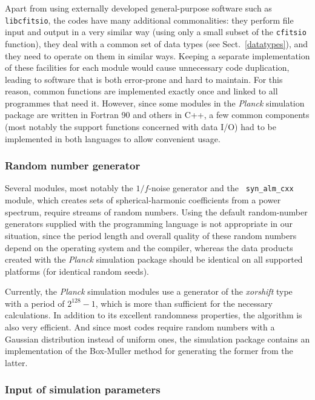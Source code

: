 \documentclass{aa}
\begin{document}
Apart from using externally developed general-purpose software such as
{\tt libcfitsio}, the codes have many additional commonalities:
they perform file
input and output in a very similar way (using only a small subset of
the {\tt cfitsio} function), they deal with a common set of data
types (see Sect.~\ref{datatypes}), and they need to operate on them in
similar ways. Keeping a separate implementation of these facilities
for each module would cause unnecessary code duplication, leading to
software that is both error-prone and hard to maintain. For this
reason, common functions are implemented exactly once and linked to
all programmes that need it. However, since some modules in the
\emph{Planck} simulation package are written in Fortran 90 and others
in C++, a few common components (most notably the support functions
concerned with data I/O) had to be implemented in both
languages to allow convenient usage.

\subsubsection {Random number generator}

Several modules, most notably the $1/f$-noise generator and the {\tt
syn\_alm\_cxx} module, which creates sets of spherical-harmonic
coefficients from a power spectrum, require streams of random
numbers. Using the default random-number generators supplied with the
programming language is not appropriate in our situation, since the
period length and overall quality of these random numbers depend on
the operating system and the compiler, whereas the data products
created with the \emph{Planck} simulation package should be identical
on all supported platforms (for identical random seeds).

Currently, the \emph{Planck} simulation modules use a generator of the
\emph{xorshift} type \citep{marsaglia-2003} with a period of
$2^{128}-1$, which is more than sufficient for the necessary
calculations. In addition to its excellent randomness properties, the
algorithm is also very efficient.
And since most codes require random numbers with a Gaussian distribution instead
of uniform ones, the simulation package contains an implementation of the
Box-Muller method \citep{box-muller-1958} for generating the former from the
latter.

\subsubsection {Input of simulation parameters}
\end{document}
